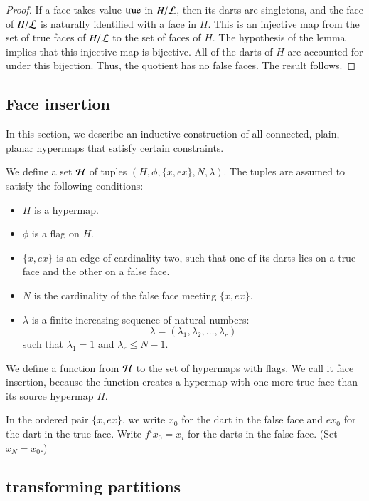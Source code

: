\begin{proof}  If a face takes value ${\operatorname{true}}$ 
in $H/{\cal L}$, then its darts are
singletons, and the face of $H/{\cal L}$ is naturally identified with
 a face in $H$.  This is an injective map from the 
set of true faces of $H/{\cal L}$ to
the set of faces of $H$.  The hypothesis of the lemma implies that this
injective map is bijective.
All of the darts of $H$ are accounted for under this bijection.
Thus, the quotient has no
false faces.  The result follows.
\end{proof}


\subsection{Face insertion}


In this section, we describe an inductive construction of all
connected, plain, planar hypermaps that satisfy certain constraints.

We define a set ${\cal H}$ of tuples $(H,\phi,\{x,e x\},N,\lambda)$.
The tuples are assumed to satisfy the following conditions:
\begin{itemize}
    \item $H$ is a hypermap.
    \item $\phi$ is a flag on $H$.
    \item $\{x,e x\}$ is an edge of cardinality two, such that one
    of its darts lies on a true face and the other on a false face.
    \item $N$ is the cardinality of the false face meeting $\{x,e
    x\}$.
    \item $\lambda$ is a finite increasing sequence of natural numbers:
        $$
        \lambda = (\lambda_1,\lambda_2,\ldots,\lambda_r)
        $$
    such that $\lambda_1 = 1$ and $\lambda_r \le N-1$.
\end{itemize}

We define a function from $\cal H$ to the set of hypermaps with
flags.  We call it face insertion, because the function creates a
hypermap with one more true face than its source hypermap $H$.

In the ordered pair $\{x,e x\}$, we write $x_0$ for the dart in the
false face and $e x_0$ for the dart in the true face.  Write $f^i
x_0 = x_i$ for the darts in the false face.  (Set $x_N = x_0$.)

\subsection{transforming partitions}

